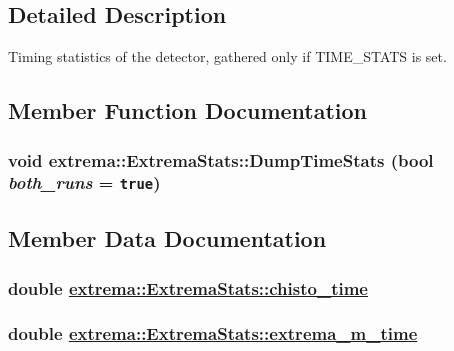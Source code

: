 \subsection{Detailed Description}
Timing statistics of the detector, gathered only if TIME\_\-STATS is set. 



\subsection{Member Function Documentation}
\hypertarget{structextrema_1_1ExtremaStats_ea026cc226d88cb0a51ebe3ef6799bc5}{
\subsubsection[DumpTimeStats]{\setlength{\rightskip}{0pt plus 5cm}void extrema::Extrema\-Stats::Dump\-Time\-Stats (bool {\em both\_\-runs} = {\tt true})}}
\label{structextrema_1_1ExtremaStats_ea026cc226d88cb0a51ebe3ef6799bc5}




\subsection{Member Data Documentation}
\hypertarget{structextrema_1_1ExtremaStats_4a72f1f5b348ab51bfbd67adef65ea65}{
\subsubsection[chisto\_\-time]{\setlength{\rightskip}{0pt plus 5cm}double \hyperlink{structextrema_1_1ExtremaStats_4a72f1f5b348ab51bfbd67adef65ea65}{extrema::Extrema\-Stats::chisto\_\-time}}}
\label{structextrema_1_1ExtremaStats_4a72f1f5b348ab51bfbd67adef65ea65}


\hypertarget{structextrema_1_1ExtremaStats_03647c7adf4517547e0bf069a1e3d3fe}{
\subsubsection[extrema\_\-m\_\-time]{\setlength{\rightskip}{0pt plus 5cm}double \hyperlink{structextrema_1_1ExtremaStats_03647c7adf4517547e0bf069a1e3d3fe}{extrema::Extrema\-Stats::extrema\_\-m\_\-time}}}
\label{structextrema_1_1ExtremaStats_03647c7adf4517547e0bf069a1e3d3fe}



